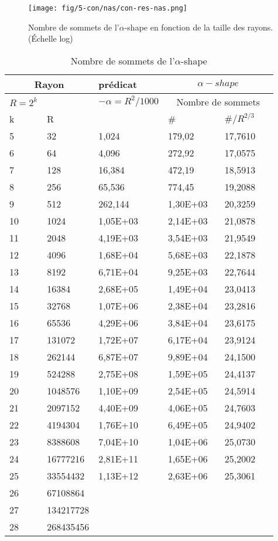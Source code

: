 \begin{figure}[H]
  \centering
  \texttt{[image: fig/5-con/nas/con-res-nas.png]}
  \caption{Nombre de sommets de l'$\alpha$-shape en fonction de la taille des rayons. (Échelle log)}
\end{figure}


\begin{table}[H]
  \begin{tabular}{|p{0.09\linewidth}|p{0.13\linewidth}||p{0.23\linewidth}||p{0.23\linewidth}|p{0.23\linewidth}|}
    \hline
    \multicolumn{2}{|c||}{Rayon} & prédicat               & \multicolumn{2}{|c|}{$\alpha-shape$} \\  \hline 
    $R=2^k$  &                   & $-\alpha = R^{2}/1000$ & \multicolumn{2}{|c|}{Nombre de sommets} \\ \hline
    k        & R                 &                        & \# & $\# / R^{2/3}$ \\ 
    \hline
    5  & 32        & 1,024    & 179,02   & 17,7610\\
    6  & 64        & 4,096    & 272,92   & 17,0575\\
    7  & 128       & 16,384   & 472,19   & 18,5913\\
    8  & 256       & 65,536   & 774,45   & 19,2088\\
    9  & 512       & 262,144  & 1,30E+03 & 20,3259\\
    10 & 1024      & 1,05E+03 & 2,14E+03 & 21,0878\\
    11 & 2048      & 4,19E+03 & 3,54E+03 & 21,9549\\
    12 & 4096      & 1,68E+04 & 5,68E+03 & 22,1878\\
    13 & 8192      & 6,71E+04 & 9,25E+03 & 22,7644\\
    14 & 16384     & 2,68E+05 & 1,49E+04 & 23,0413\\
    15 & 32768     & 1,07E+06 & 2,38E+04 & 23,2816\\
    16 & 65536     & 4,29E+06 & 3,84E+04 & 23,6175\\
    17 & 131072    & 1,72E+07 & 6,17E+04 & 23,9124\\
    18 & 262144    & 6,87E+07 & 9,89E+04 & 24,1500\\
    19 & 524288    & 2,75E+08 & 1,59E+05 & 24,4137\\
    20 & 1048576   & 1,10E+09 & 2,54E+05 & 24,5914\\
    21 & 2097152   & 4,40E+09 & 4,06E+05 & 24,7603\\
    22 & 4194304   & 1,76E+10 & 6,49E+05 & 24,9402\\
    23 & 8388608   & 7,04E+10 & 1,04E+06 & 25,0730\\
    24 & 16777216  & 2,81E+11 & 1,65E+06 & 25,2002\\
    25 & 33554432  & 1,13E+12 & 2,63E+06 & 25,3061\\
    26 & 67108864  &  &  & \\
    27 & 134217728 &  &  & \\
    28 & 268435456 &  &  & \\
    \hline
  \end{tabular} 
  \caption{Nombre de sommets de l'$\alpha$-shape}
\end{table}

